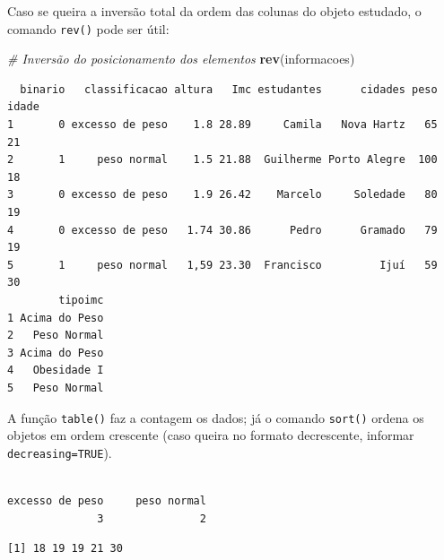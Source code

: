 \documentclass[12pt,brazil,]{book}
\newenvironment{Shaded}{\begin{snugshade}}{\end{snugshade}}
\newcommand{\CommentTok}[1]{\textcolor[rgb]{0.56,0.35,0.01}{\textit{#1}}}
\newcommand{\KeywordTok}[1]{\textcolor[rgb]{0.13,0.29,0.53}{\textbf{#1}}}
\newcommand{\NormalTok}[1]{#1}
\newcommand{\OperatorTok}[1]{\textcolor[rgb]{0.81,0.36,0.00}{\textbf{#1}}}
\begin{document}
Caso se queira a inversão total da ordem das colunas do objeto estudado,
o comando \texttt{rev()} pode ser útil:

\begin{Shaded}
\begin{Highlighting}[]
\CommentTok{# Inversão do posicionamento dos elementos}
\KeywordTok{rev}\NormalTok{(informacoes)}
\end{Highlighting}
\end{Shaded}

\begin{verbatim}
  binario   classificacao altura   Imc estudantes      cidades peso idade
1       0 excesso de peso    1.8 28.89     Camila   Nova Hartz   65    21
2       1     peso normal    1.5 21.88  Guilherme Porto Alegre  100    18
3       0 excesso de peso    1.9 26.42    Marcelo     Soledade   80    19
4       0 excesso de peso   1.74 30.86      Pedro      Gramado   79    19
5       1     peso normal   1,59 23.30  Francisco         Ijuí   59    30
        tipoimc
1 Acima do Peso
2   Peso Normal
3 Acima do Peso
4   Obesidade I
5   Peso Normal
\end{verbatim}

A função \texttt{table()} faz a contagem os dados; já o comando
\texttt{sort()} ordena os objetos em ordem crescente (caso queira no
formato decrescente, informar \texttt{decreasing=TRUE}).

\begin{Shaded}
\end{Shaded}

\begin{verbatim}

excesso de peso     peso normal 
              3               2 
\end{verbatim}

\begin{Shaded}
\end{Shaded}

\begin{verbatim}
[1] 18 19 19 21 30
\end{verbatim}
\end{document}
